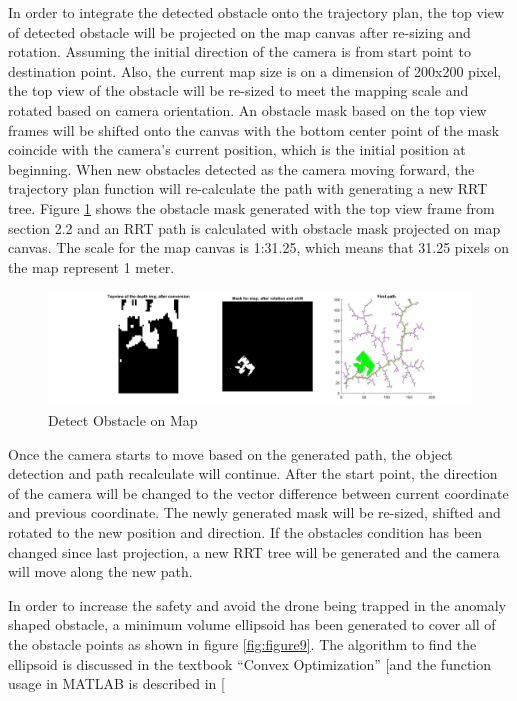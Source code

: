 \documentclass[
  oneside]{ubcthesis}
\begin{document}
In order to integrate the detected obstacle onto the trajectory plan, the top view of detected obstacle will be projected on the map canvas after re-sizing and rotation. Assuming the initial direction of the camera is from start point to destination point. Also, the current map size is on a dimension of 200x200 pixel, the top view of the obstacle will be re-sized to meet the mapping scale and rotated based on camera orientation. An obstacle mask based on the top view frames will be shifted onto the canvas with the bottom center point of the mask coincide with the camera's current position, which is the initial position at beginning. When new obstacles detected as the camera moving forward, the trajectory plan function will re-calculate the path with generating a new RRT tree. Figure \ref{fig:figure8} shows the obstacle mask generated with the top view frame from section 2.2 and an RRT path is calculated with obstacle mask projected on map canvas. The scale for the map canvas is 1:31.25, which means that 31.25 pixels on the map represent 1 meter.

\begin{figure}

{\centering \includegraphics[width=0.9\linewidth]{figures/8} 

}

\caption{Detect Obstacle on Map}\label{fig:figure8}
\end{figure}



Once the camera starts to move based on the generated path, the object detection and path recalculate will continue. After the start point, the direction of the camera will be changed to the vector difference between current coordinate and previous coordinate. The newly generated mask will be re-sized, shifted and rotated to the new position and direction. If the obstacles condition has been changed since last projection, a new RRT tree will be generated and the camera will move along the new path.

In order to increase the safety and avoid the drone being trapped in the anomaly shaped obstacle, a minimum volume ellipsoid has been generated to cover all of the obstacle points as shown in figure \ref{fig:figure9}. The algorithm to find the ellipsoid is discussed in the textbook ``Convex Optimization'' {[}\citep{convexOpt}and the function usage in MATLAB is described in {[}\citep{miniEllipsoid}
\end{document}
